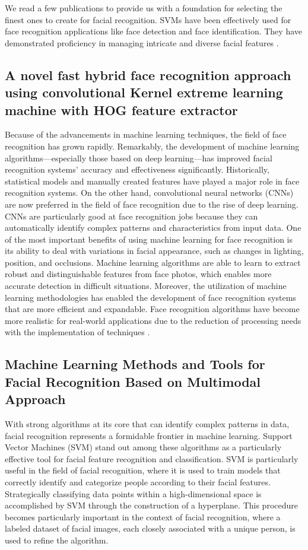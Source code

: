 \documentclass[12pt,a4paper,twocolumn]{article}
\begin{document}
We read a few publications to provide us with a foundation for selecting the finest ones to create for facial recognition. SVMs have been effectively used for face recognition applications like face detection and face identification. They have demonstrated proficiency in managing intricate and diverse facial features\cite{paper5} \cite{paper2}.

\subsection{A novel fast hybrid face recognition approach using convolutional Kernel extreme learning machine with HOG feature extractor\cite{paperContext}}
Because of the advancements in machine learning techniques, the field of face recognition has grown rapidly. Remarkably, the development of machine learning algorithms—especially those based on deep learning—has improved facial recognition systems' accuracy and effectiveness significantly.
Historically, statistical models and manually created features have played a major role in face recognition systems. On the other hand, convolutional neural networks (CNNs) are now preferred in the field of face recognition due to the rise of deep learning. CNNs are particularly good at face recognition jobs because they can automatically identify complex patterns and characteristics from input data.
One of the most important benefits of using machine learning for face recognition is its ability to deal with variations in facial appearance, such as changes in lighting, position, and occlusions. Machine learning algorithms are able to learn to extract robust and distinguishable features from face photos, which enables more accurate detection in difficult situations.
Moreover, the utilization of machine learning methodologies has enabled the development of face recognition systems that are more efficient and expandable. Face recognition algorithms have become more realistic for real-world applications due to the reduction of processing needs with the implementation of techniques .

\subsection{Machine Learning Methods and Tools for Facial Recognition
Based on Multimodal Approach\cite{paper2}}
With strong algorithms at its core that can identify complex patterns in data, facial recognition represents a formidable frontier in machine learning. Support Vector Machines (SVM) stand out among these algorithms as a particularly effective tool for facial feature recognition and classification. SVM is particularly useful in the field of facial recognition, where it is used to train models that correctly identify and categorize people according to their facial features. Strategically classifying data points within a high-dimensional space is accomplished by SVM through the construction of a hyperplane. This procedure becomes particularly important in the context of facial recognition, where a labeled dataset of facial images, each closely associated with a unique person, is used to refine the algorithm.
\end{document}
